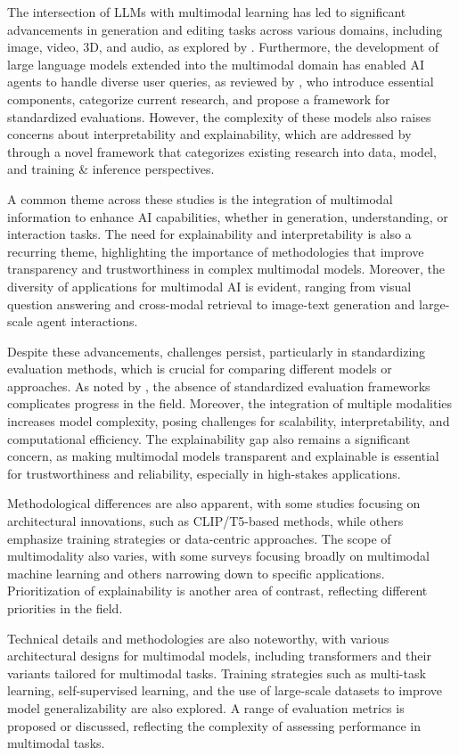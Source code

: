 \documentclass[conference]{IEEEtran}
\begin{document}
The intersection of LLMs with multimodal learning has led to significant advancements in generation and editing tasks across various domains, including image, video, 3D, and audio, as explored by \cite{b3}. Furthermore, the development of large language models extended into the multimodal domain has enabled AI agents to handle diverse user queries, as reviewed by \cite{b4}, who introduce essential components, categorize current research, and propose a framework for standardized evaluations. However, the complexity of these models also raises concerns about interpretability and explainability, which are addressed by \cite{b5} through a novel framework that categorizes existing research into data, model, and training \& inference perspectives.

A common theme across these studies is the integration of multimodal information to enhance AI capabilities, whether in generation, understanding, or interaction tasks. The need for explainability and interpretability is also a recurring theme, highlighting the importance of methodologies that improve transparency and trustworthiness in complex multimodal models. Moreover, the diversity of applications for multimodal AI is evident, ranging from visual question answering and cross-modal retrieval to image-text generation and large-scale agent interactions.

Despite these advancements, challenges persist, particularly in standardizing evaluation methods, which is crucial for comparing different models or approaches. As noted by \cite{b1}, the absence of standardized evaluation frameworks complicates progress in the field. Moreover, the integration of multiple modalities increases model complexity, posing challenges for scalability, interpretability, and computational efficiency. The explainability gap also remains a significant concern, as making multimodal models transparent and explainable is essential for trustworthiness and reliability, especially in high-stakes applications.

Methodological differences are also apparent, with some studies focusing on architectural innovations, such as CLIP/T5-based methods, while others emphasize training strategies or data-centric approaches. The scope of multimodality also varies, with some surveys focusing broadly on multimodal machine learning and others narrowing down to specific applications. Prioritization of explainability is another area of contrast, reflecting different priorities in the field.

Technical details and methodologies are also noteworthy, with various architectural designs for multimodal models, including transformers and their variants tailored for multimodal tasks. Training strategies such as multi-task learning, self-supervised learning, and the use of large-scale datasets to improve model generalizability are also explored. A range of evaluation metrics is proposed or discussed, reflecting the complexity of assessing performance in multimodal tasks.
\end{document}
